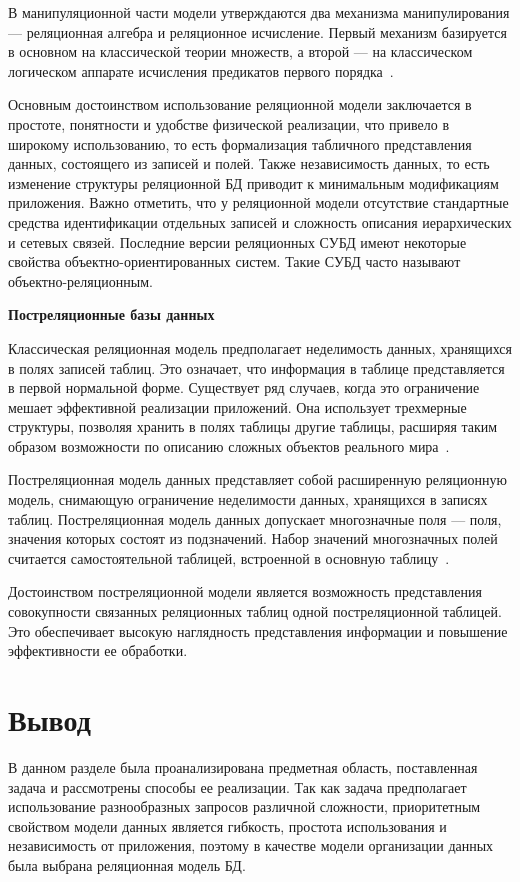 В манипуляционной части модели утверждаются два механизма
манипулирования --- реляционная алгебра и реляционное исчисление.
Первый механизм базируется в основном на классической теории множеств, а второй --- на классическом логическом аппарате исчисления
предикатов первого порядка~\cite{kuznecov-db}. 

Основным достоинством использование реляционной модели заключается в простоте, понятности и удобстве физической реализации, что привело в широкому использованию, то есть формализация табличного представления данных, состоящего из записей и полей. Также независимость данных, то есть изменение структуры реляционной БД приводит к минимальным модификациям приложения. Важно отметить, что у реляционной модели отсутствие стандартные средства идентификации отдельных записей и сложность описания иерархических и сетевых связей.
Последние версии реляционных СУБД имеют некоторые
свойства объектно-ориентированных систем. 
Такие СУБД часто называют объектно-реляционным.

\textbf{Постреляционные базы данных}

Классическая реляционная модель предполагает неделимость данных, хранящихся в полях записей таблиц. Это означает, что информация в таблице представляется в первой нормальной форме. 
Существует ряд случаев, когда это ограничение мешает эффективной реализации приложений. 
Она использует трехмерные структуры, позволяя хранить в полях таблицы другие таблицы, расширяя таким образом возможности по описанию сложных объектов реального мира~\cite{postsql-db}. 

Постреляционная модель данных представляет собой расширенную реляционную модель, снимающую ограничение
неделимости данных, хранящихся в записях таблиц. 
Постреляционная модель данных допускает многозначные поля --- поля, значения которых состоят из подзначений. 
Набор значений многозначных полей считается самостоятельной таблицей, встроенной в основную таблицу~\cite{postsql-db}.

Достоинством постреляционной модели является возможность представления совокупности связанных реляционных таблиц одной постреляционной таблицей. Это обеспечивает высокую наглядность представления информации и повышение эффективности ее обработки.

\section*{Вывод}

В данном разделе была проанализирована предметная область, поставленная задача и рассмотрены способы ее реализации.
Так как задача предполагает использование разнообразных запросов различной сложности, приоритетным свойством модели данных является гибкость, простота использования и независимость от приложения, поэтому в качестве модели организации данных была выбрана реляционная модель БД.